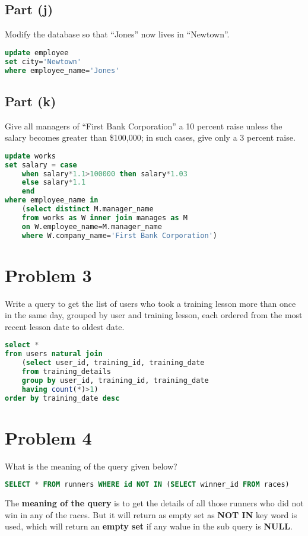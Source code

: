 \documentclass{article}
\begin{document}
\subsection{Part (j)}
Modify the database so that “Jones” now lives in “Newtown”.
\begin{lstlisting}[language=sql]
update employee
set city='Newtown'
where employee_name='Jones'
\end{lstlisting}

\newpage
\subsection{Part (k)}
Give all managers of “First Bank Corporation” a 10 percent raise unless the salary becomes greater
than \$100,000; in such cases, give only a 3 percent raise.
\begin{lstlisting}[language=sql]
update works
set salary = case
    when salary*1.1>100000 then salary*1.03
    else salary*1.1
    end
where employee_name in 
    (select distinct M.manager_name
    from works as W inner join manages as M
    on W.employee_name=M.manager_name
    where W.company_name='First Bank Corporation')
\end{lstlisting}

\section{Problem 3}
Write a query to get the list of users who took a training lesson more than once in the same day, grouped by
user and training lesson, each ordered from the most recent lesson date to oldest date.
\begin{lstlisting}[language=sql]
select *
from users natural join 
    (select user_id, training_id, training_date
    from training_details
    group by user_id, training_id, training_date
    having count(*)>1)
order by training_date desc
\end{lstlisting}

\section{Problem 4}
What is the meaning of the query given below? 
\begin{lstlisting}[language=sql]
  SELECT * FROM runners WHERE id NOT IN (SELECT winner_id FROM races)
\end{lstlisting}
The \textbf{meaning of the query} is to get the details of all those runners who did not win in any of the races.
But it will return as empty set as \textbf{NOT IN} key word is used,
which will return an \textbf{empty set} if any walue in the sub query is \textbf{NULL}.
\end{document}
